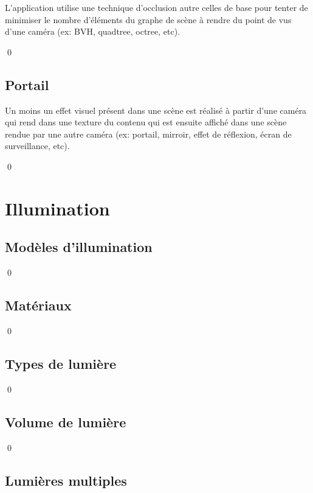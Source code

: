 \documentclass[12pt]{article}
\newcommand{\state}{\noindent}
\begin{document}
\state
L'application utilise une technique d'occlusion autre celles de base pour tenter de minimiser le nombre d'éléments du graphe de scène à rendre du point de vus d'une caméra (ex: BVH, quadtree, octree, etc).

\qed

\subsection{Portail}

\state
Un moins un effet visuel présent dans une scène est réalisé à partir d'une caméra qui rend dans une texture du contenu qui est ensuite affiché dans une scène rendue par une autre caméra (ex: portail, mirroir, effet de réflexion, écran de surveillance, etc). 

\qed

\pagebreak


\section{Illumination}

\subsection{Modèles d'illumination}

\state

\qed

\subsection{Matériaux}

\state

\qed

\subsection{Types de lumière}

\state

\qed

\subsection{Volume de lumière}

\state

\qed

\subsection{Lumières multiples}
\end{document}
